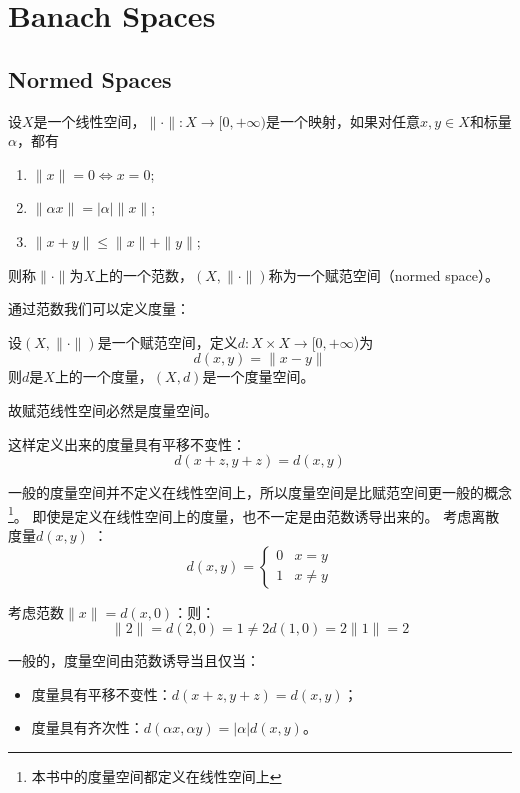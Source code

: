 \chapter{Banach Spaces}
\section{Normed Spaces}

\begin{definition}
    设\(X\)是一个线性空间，\(\|\cdot\|:X\to [0,+\infty)\)是一个映射，如果对任意\(x,y\in
    X\)和标量\(\alpha\)，都有
    \begin{enumerate}
        \item \(\|x\|=0 \Leftrightarrow x=0\);
        \item \(\|\alpha x\|=|\alpha|\|x\|\);
        \item \(\|x+y\|\leq \|x\|+\|y\|\);
    \end{enumerate}
    则称\(\|\cdot\|\)为\(X\)上的一个范数，\((X,\|\cdot\|)\)称为一个赋范空间（normed space）。
\end{definition}

通过范数我们可以定义度量：

\begin{definition}[范数诱导出的度量]
    设\((X,\|\cdot\|)\)是一个赋范空间，定义\(d:X\times X\to [0,+\infty)\)为
    \[
        d(x,y)=\|x-y\|
    \]
    则\(d\)是\(X\)上的一个度量，\((X,d)\)是一个度量空间。
\end{definition}

故赋范线性空间必然是度量空间。

这样定义出来的度量具有平移不变性：\[
    d(x+z,y+z)=d(x,y)
\]

一般的度量空间并不定义在线性空间上，所以度量空间是比赋范空间更一般的概念\footnote{本书中的度量空间都定义在线性空间上}。
即使是定义在线性空间上的度量，也不一定是由范数诱导出来的。
考虑离散度量\(d(x,y)\) ：
\[
    d(x,y)=
    \begin{cases}
        0 & x=y\\
        1 & x\neq y
    \end{cases}
\]

考虑范数\( \|x\| = d(x,0)\)：则：
\[
    \|2\| = d(2,0) = 1 \neq 2 d(1,0) = 2 \|1\|=2
\]

一般的，度量空间由范数诱导当且仅当：
\begin{itemize}
    \item 度量具有平移不变性：\(d(x+z,y+z)=d(x,y)\)；
    \item 度量具有齐次性：\(d(\alpha x, \alpha y) = |\alpha| d(x,y)\)。
\end{itemize}

